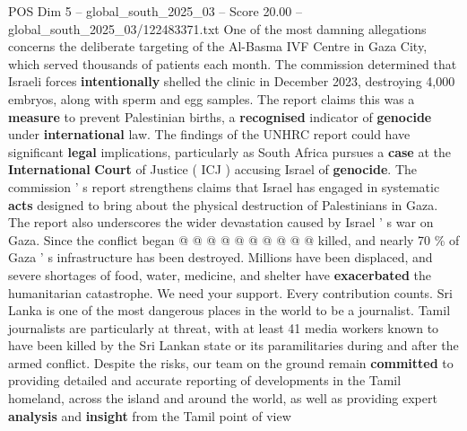 \begin{textsample}{POS Dim 5 – global\_south\_2025\_03 – Score 20.00 – global\_south\_2025\_03/122483371.txt}
One of the most damning allegations concerns the deliberate targeting of the Al-Basma IVF Centre in Gaza City, which served thousands of patients each month.
The commission determined that Israeli forces \textbf{intentionally} shelled the clinic in December 2023, destroying 4,000 embryos, along with sperm and egg samples.
The report claims this was a \textbf{measure} to prevent Palestinian births, a \textbf{recognised} indicator of \textbf{genocide} under \textbf{international} law.
The findings of the UNHRC report could have significant \textbf{legal} implications, particularly as South Africa pursues a \textbf{case} at the \textbf{International} \textbf{Court} of Justice ( ICJ ) accusing Israel of \textbf{genocide}.
The commission ' s report strengthens claims that Israel has engaged in systematic \textbf{acts} designed to bring about the physical destruction of Palestinians in Gaza.
The report also underscores the wider devastation caused by Israel ' s war on Gaza.
Since the conflict began @ @ @ @ @ @ @ @ @ @ killed, and nearly 70 \% of Gaza ' s infrastructure has been destroyed.
Millions have been displaced, and severe shortages of food, water, medicine, and shelter have \textbf{exacerbated} the humanitarian catastrophe.
We need your support.
Every contribution counts.
Sri Lanka is one of the most dangerous places in the world to be a journalist.
Tamil journalists are particularly at threat, with at least 41 media workers known to have been killed by the Sri Lankan state or its paramilitaries during and after the armed conflict.
Despite the risks, our team on the ground remain \textbf{committed} to providing detailed and accurate reporting of developments in the Tamil homeland, across the island and around the world, as well as providing expert \textbf{analysis} and \textbf{insight} from the Tamil point of view

\end{textsample}
